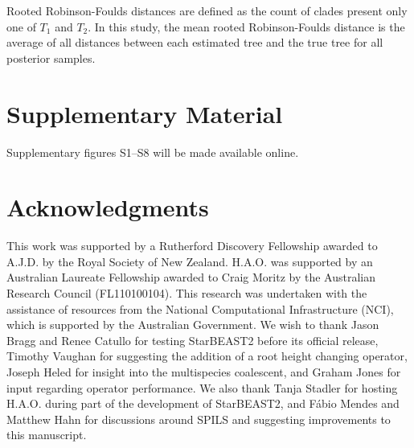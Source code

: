 \documentclass[12pt]{article}
\begin{document}
Rooted Robinson-Foulds distances \citep{ROBINSON1981131} are defined as the
count of clades present only one of $T_1$ and $T_2$. In this study, the mean
rooted Robinson-Foulds distance is the average of all distances between each
estimated tree and the true tree for all posterior samples.

\section{Supplementary Material}
Supplementary figures S1--S8 will be made available online.

\section{Acknowledgments}

This work was supported by a Rutherford Discovery Fellowship awarded to A.J.D.
by the Royal Society of New Zealand. H.A.O. was supported by an Australian
Laureate Fellowship awarded to Craig Moritz by the Australian Research Council
(FL110100104). This research was undertaken with the assistance of resources
from the National Computational Infrastructure (NCI), which is supported by the
Australian Government. We wish to thank Jason Bragg and Renee Catullo for
testing StarBEAST2 before its official release, Timothy Vaughan for suggesting
the addition of a root height changing operator, Joseph Heled for insight into
the multispecies coalescent, and Graham Jones for input regarding operator
performance. We also thank Tanja Stadler for hosting H.A.O. during part of the
development of StarBEAST2, and F\'abio Mendes and Matthew Hahn for discussions around
SPILS and suggesting improvements to this manuscript.



\end{document}
